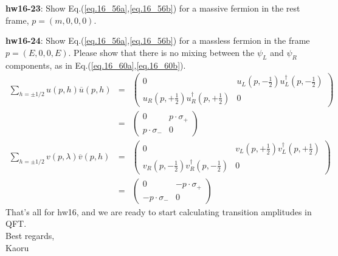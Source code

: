 \documentclass[12pt]{article}
\def\dgr{\dagger}
\begin{document}
{\bf hw16-23}: Show Eq.(\ref{eq.16_56a},\ref{eq.16_56b}) for a massive fermion in the rest frame, $p = (m, 0, 0, 0)$.

{\bf hw16-24}: Show Eq.(\ref{eq.16_56a},\ref{eq.16_56b}) for a massless fermion in the frame $p = (E, 0, 0, E)$. Please show that there is no mixing
between the $\psi_L$ and $\psi_R$ components, as in Eq.(\ref{eq.16_60a},\ref{eq.16_60b}).
\begin{eqnarray}
  \sum_{h=\pm1/2} u(p,h) {\overline u}(p,h) &=&
  \begin{pmatrix}
    0 & u_L(p,-\frac{1}{2}) u_L^\dgr(p,-\frac{1}{2}) \\
    u_R(p,+\frac{1}{2}) u_R^\dgr(p,+\frac{1}{2}) & 0
  \end{pmatrix}\nonumber \\
  &=&
  \begin{pmatrix}
    0 & p\cdot \sigma_+\\
    p\cdot \sigma_- & 0
  \end{pmatrix} \label{eq.16_60a} \\
  \sum_{h=\pm1/2} v(p,\lambda) {\overline v}(p,h)&=&
  \begin{pmatrix}
    0 & v_L(p,+\frac{1}{2}) v_L^\dgr(p,+\frac{1}{2}) \\
    v_R(p,-\frac{1}{2}) v_R^\dgr(p,-\frac{1}{2}) & 0 
  \end{pmatrix} \nonumber \\
  &=&
  \begin{pmatrix}
    0 & -p\cdot \sigma_+\\
    -p\cdot \sigma_- & 0
  \end{pmatrix} \label{eq.16_60b}
\end{eqnarray}
That's all for hw16, and we are ready to start calculating transition 
amplitudes in QFT.\\

Best regards,\\

Kaoru
\end{document}
